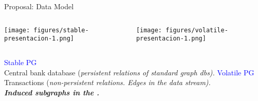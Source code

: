 \begin{frame}{Proposal: Data Model}
    \begin{columns}
        \begin{center}
            \texttt{[image: figures/stable-presentacion-1.png]}  
        \end{center}

        \begin{center} 
            \texttt{[image: figures/volatile-presentacion-1.png]}
        \end{center}
    \end{columns}
    \vspace{0.6em}
    \begin{columns}
        \hspace{4.7em}\textcolor{blue}{Stable PG} \\Central bank database 
        {\small(\emph{persistent relations of standard graph dbs).}}
        \hspace{4.7em}
        \textcolor{blue}{Volatile PG} \\
        \vspace{0.3em}
        Transactions 
        {\small(\emph{non-persistent relations. Edges in the data stream).\\
        \textbf{Induced subgraphs in the \DPATM.}}}
    \end{columns}
    
\end{frame}


